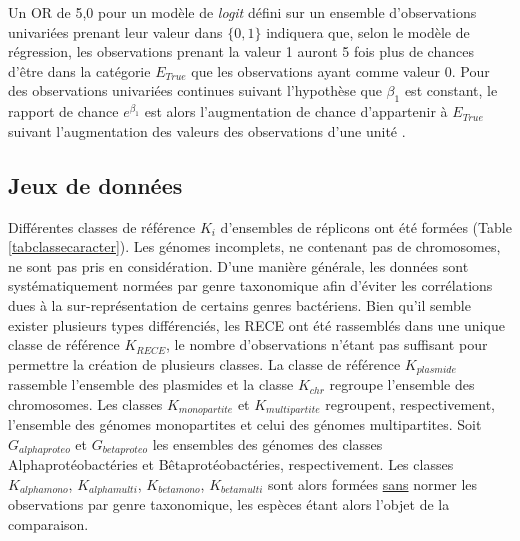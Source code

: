 Un OR de 5,0 pour un modèle de \textit{logit} défini sur un ensemble d'observations univariées prenant leur valeur dans $\{0,1\}$ indiquera que, selon le modèle de régression, les observations prenant la valeur 1 auront 5 fois plus de chances d'être dans la catégorie $E_{True}$ que les observations ayant comme valeur $0$. Pour des observations univariées continues suivant l'hypothèse que $\beta_{1}$ est constant, le rapport de chance $e^{\beta_{1}}$ est alors l'augmentation de chance d'appartenir à $E_{True}$ suivant l'augmentation des valeurs des observations d'une unité \citep{hosmer2013applied}. \\


\subsection{Jeux de données}\label{parregjeuxdedonnee}
Différentes classes de référence $K_{i}$ d'ensembles de réplicons ont été formées (Table \ref{tabclassecaracter}).  Les génomes incomplets, ne contenant pas de chromosomes, ne sont pas pris en considération. D'une manière générale, les données sont systématiquement normées par genre taxonomique afin d'éviter les corrélations dues à la sur-représentation de certains genres bactériens. Bien qu'il semble exister plusieurs types différenciés, les RECE ont été rassemblés dans une unique classe de référence $K_{RECE}$, le nombre d'observations n'étant pas suffisant pour permettre la création de plusieurs classes. La classe de référence $K_{plasmide}$ rassemble l'ensemble des plasmides et la classe $K_{chr}$ regroupe l'ensemble des chromosomes. Les classes $K_{monopartite}$ et $K_{multipartite}$ regroupent, respectivement, l'ensemble des génomes monopartites et celui des génomes multipartites. Soit $G_{alphaproteo}$ et $G_{betaproteo}$ les ensembles des génomes des classes Alphaprotéobactéries et Bêtaprotéobactéries, respectivement. Les classes $K_{alphamono}$, $K_{alphamulti}$, $K_{betamono}$, $K_{betamulti}$ sont alors formées \underline{sans} normer les observations par genre taxonomique, les espèces étant alors l'objet de la comparaison. 

